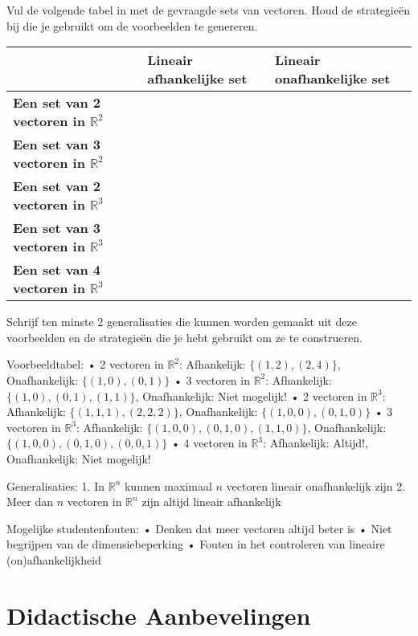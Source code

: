 \documentclass{ximera}
\begin{document}
\begin{problem}
Vul de volgende tabel in met de gevraagde sets van vectoren. Houd de strategieën bij die je gebruikt om de voorbeelden te genereren.

\begin{center}
\begin{tabular}{|p{4cm}|p{4cm}|p{4cm}|}
\hline
& \textbf{Lineair afhankelijke set} & \textbf{Lineair onafhankelijke set} \\
\hline
\textbf{Een set van 2 vectoren in $\mathbb{R}^2$} & & \\
\hline
\textbf{Een set van 3 vectoren in $\mathbb{R}^2$} & & \\
\hline
\textbf{Een set van 2 vectoren in $\mathbb{R}^3$} & & \\
\hline
\textbf{Een set van 3 vectoren in $\mathbb{R}^3$} & & \\
\hline
\textbf{Een set van 4 vectoren in $\mathbb{R}^3$} & & \\
\hline
\end{tabular}
\end{center}

Schrijf ten minste 2 generalisaties die kunnen worden gemaakt uit deze voorbeelden en de strategieën die je hebt gebruikt om ze te construeren.

\begin{freeResponse}
Voorbeeldtabel:
• 2 vectoren in $\mathbb{R}^2$: Afhankelijk: $\{(1,2), (2,4)\}$, Onafhankelijk: $\{(1,0), (0,1)\}$
• 3 vectoren in $\mathbb{R}^2$: Afhankelijk: $\{(1,0), (0,1), (1,1)\}$, Onafhankelijk: Niet mogelijk!
• 2 vectoren in $\mathbb{R}^3$: Afhankelijk: $\{(1,1,1), (2,2,2)\}$, Onafhankelijk: $\{(1,0,0), (0,1,0)\}$
• 3 vectoren in $\mathbb{R}^3$: Afhankelijk: $\{(1,0,0), (0,1,0), (1,1,0)\}$, Onafhankelijk: $\{(1,0,0), (0,1,0), (0,0,1)\}$
• 4 vectoren in $\mathbb{R}^3$: Afhankelijk: Altijd!, Onafhankelijk: Niet mogelijk!

Generalisaties:
1. In $\mathbb{R}^n$ kunnen maximaal $n$ vectoren lineair onafhankelijk zijn
2. Meer dan $n$ vectoren in $\mathbb{R}^n$ zijn altijd lineair afhankelijk

Mogelijke studentenfouten:
• Denken dat meer vectoren altijd beter is
• Niet begrijpen van de dimensiebeperking
• Fouten in het controleren van lineaire (on)afhankelijkheid
\end{freeResponse}
\end{problem}

\section*{Didactische Aanbevelingen}
\end{document}
